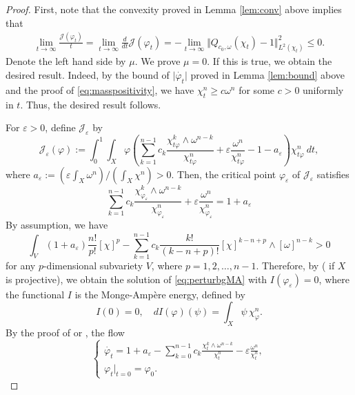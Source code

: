 \documentclass{amsart}
\numberwithin{equation}{section}
\theoremstyle{plain}
\theoremstyle{definition}
\theoremstyle{remark}
\begin{document}
\begin{proof}
    First, note that the convexity proved in Lemma \ref{lem:conv} above implies that
    \begin{align*}
        \lim_{t\to\infty}\frac{\mathcal{J}(\varphi_t)}{t}=\lim_{t\to\infty}\frac{d}{dt}\mathcal{J}(\varphi_t)=-\lim_{t\to\infty}\Vert Q_{c_0,\omega}(\chi_t)-1\Vert^2_{L^2(\chi_t)}\le0.
    \end{align*}
    Denote the left hand side by $\mu$. We prove $\mu=0$. If this is true, we obtain the desired result. Indeed, by the bound of $\vert\dot{\varphi_t}\vert$ proved in Lemma \ref{lem:bound} above and the proof of \eqref{eq:masspositivity}, we have $\chi^n_t\ge c\omega^n$ for some $c>0$ uniformly in $t$. Thus, the desired result follows.
    
    For $\varepsilon>0$, define $\mathcal{J}_\varepsilon$ by
    $$\mathcal{J}_{\varepsilon}(\varphi):=\int_0^1\int_X\varphi\left(\sum_{k=1}^{n-1}c_k\frac{\chi_{t\varphi}^k\wedge\omega^{n-k}}{\chi_{t\varphi}^n}+\varepsilon\frac{\omega^n}{\chi_{t\varphi}^n}-1-a_{\varepsilon}\right)\chi_{t\varphi}^n\ dt,$$
    where $a_\varepsilon:=(\varepsilon\int_X\omega^n)/(\int_X\chi^n)>0$.
    Then, the critical point $\varphi_\varepsilon$ of $\mathcal{J}_{\varepsilon}$ satisfies
    \begin{equation}\label{eq:perturbgMA}
        \sum_{k=1}^{n-1}c_k\frac{\chi_{\varphi_\varepsilon}^k\wedge\omega^{n-k}}{\chi_{\varphi_\varepsilon}^n}+\varepsilon\frac{\omega^n}{\chi_{\varphi_\varepsilon}^n}=1+a_{\varepsilon}
    \end{equation}
    By assumption, we have
    $$\int_V(1+a_\varepsilon)\frac{n!}{p!}[\chi]^p-\sum_{k=1}^{n-1}c_k\frac{k!}{(k-n+p)!}[\chi]^{k-n+p}\wedge[\omega]^{n-k}>0$$
    for any $p$-dimensional subvariety $V$, where $p=1,2,\dots,{n-1}$.
    Therefore, by \cite{FM} (\cite{Datar-Pingali} if $X$ is projective), we obtain the solution of \eqref{eq:perturbgMA} with $I(\varphi_\varepsilon)=0$, where the functional $I$ is the Monge-Ampère energy, defined by
    $$I(0)=0, \quad dI(\varphi)(\psi)=\int_X\psi\,\chi_\varphi^n.$$
    By the proof of \cite[Theorem 3]{PT} or \cite[Theorem 7.5]{Sun15}, the flow
    \begin{equation}\label{eq:perturbmixedHessianflow}
    \begin{cases}
        \dot{\varphi_t}=1+a_\varepsilon-\sum_{k=0}^{n-1}c_k\frac{\chi_t^k\wedge\omega^{n-k}}{\chi_t^n}-\varepsilon\frac{\omega^n}{\chi^n_t},\\
        \varphi_t|_{t=0}=\varphi_0.
    \end{cases}

\end{equation}
\end{proof}
\end{document}
